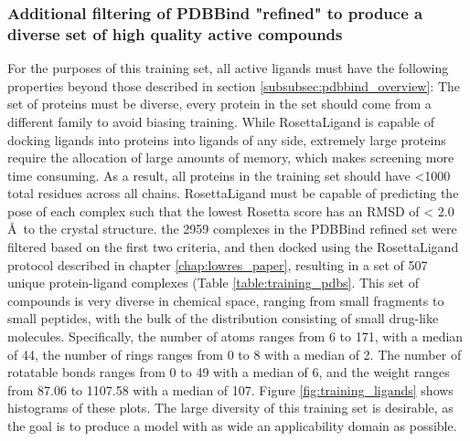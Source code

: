 \subsubsection{Additional filtering of PDBBind "refined" to produce a diverse set of high quality active compounds}
\label{subsubsec:active_poses}
For the purposes of this training set, all active ligands must have the following properties beyond those described in section \ref{subsubsec:pdbbind_overview}:
The set of proteins must be diverse, every protein in the set should come from a different family to avoid biasing training.
While RosettaLigand is capable of docking ligands into proteins into ligands of any side, extremely large proteins require the allocation of large amounts of memory, which makes screening more time consuming.
As a result, all proteins in the training set should have <1000 total residues across all chains.
RosettaLigand must be capable of predicting the pose of each complex such that the lowest Rosetta score has an RMSD of < 2.0 \AA\ to the crystal structure.
the 2959 complexes in the PDBBind refined set were filtered based on the first two criteria, and then docked using the RosettaLigand protocol described in chapter \ref{chap:lowres_paper}, resulting in a set of 507 unique protein-ligand complexes (Table \ref{table:training_pdbs}. 
This set of compounds is very diverse in chemical space, ranging from small fragments to small peptides, with the bulk of the distribution consisting of small drug-like molecules.
Specifically, the number of atoms ranges from 6 to 171, with a median of 44, the number of rings ranges from 0 to 8 with a median of 2. The number of rotatable bonds ranges from 0 to 49 with a median of 6, and the weight ranges from 87.06 to 1107.58 with a median of 107.
Figure \ref{fig:training_ligands} shows histograms of these plots.
The large diversity of this training set is desirable, as the goal is to produce a model with as wide an applicability domain as possible.

